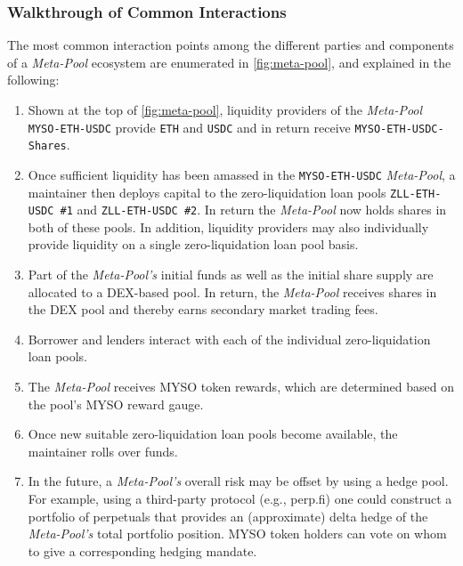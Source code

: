 \documentclass[a4paper]{article}
\begin{document}
\subsubsection{Walkthrough of Common Interactions}
\label{sec:walkthrough}
The most common interaction points among the different parties and components of a \emph{Meta-Pool} ecosystem are enumerated in \cref{fig:meta-pool}, and explained in the following:
\begin{enumerate}
    \item Shown at the top of \cref{fig:meta-pool}, liquidity providers of the \emph{Meta-Pool} \verb|MYSO-ETH-USDC| provide \verb|ETH| and \verb|USDC| and in return receive \verb|MYSO-ETH-USDC-Shares|.
    \item Once sufficient liquidity has been amassed in the \verb|MYSO-ETH-USDC| \emph{Meta-Pool}, a maintainer then deploys capital to the zero-liquidation loan pools \verb|ZLL-ETH-USDC #1| and  \verb|ZLL-ETH-USDC #2|. In return the \emph{Meta-Pool} now holds shares in both of these pools. In addition, liquidity providers may also individually provide liquidity on a single zero-liquidation loan pool basis.
    \item Part of the \emph{Meta-Pool's} initial funds as well as the initial share supply are allocated to a DEX-based pool. In return, the \emph{Meta-Pool} receives shares in the DEX pool and thereby earns secondary market trading fees. 
    \item Borrower and lenders interact with each of the individual zero-liquidation loan pools.
    \item The \emph{Meta-Pool} receives MYSO token rewards, which are determined based on the pool's MYSO reward gauge.
    \item Once new suitable zero-liquidation loan pools become available, the maintainer rolls over funds.
    \item In the future, a \emph{Meta-Pool's} overall risk may be offset by using a hedge pool. For example, using a third-party protocol (e.g., perp.fi) one could construct a portfolio of perpetuals that provides an (approximate) delta hedge of the \emph{Meta-Pool's} total portfolio position. MYSO token holders can vote on whom to give a corresponding hedging mandate. 
\end{enumerate}

\end{document}
